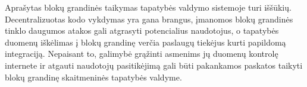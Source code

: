 Aprašytas blokų grandinės taikymas tapatybės valdymo sistemoje turi iššūkių.
Decentralizuotas kodo vykdymas yra gana brangus, įmanomos blokų grandinės tinklo daugumos
atakos gali atgrasyti potencialius naudotojus, o tapatybės duomenų iškėlimas į blokų grandinę verčia
paslaugų tiekėjus kurti papildomą integraciją. Nepaisant to, galimybė grąžinti asmenims jų duomenų kontrolę internete
ir atgauti naudotojų pasitikėjimą gali būti pakankamos paskatos taikyti blokų grandinę skaitmeninės tapatybės valdyme.